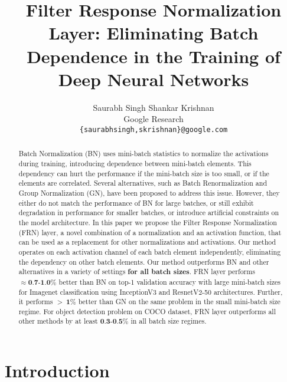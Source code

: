 \documentclass[10pt,twocolumn,letterpaper]{article}
\newcommand{\papername}{FRN}
\begin{document}
\title{Filter Response Normalization Layer: Eliminating Batch Dependence in the Training of Deep Neural Networks}

\author{Saurabh Singh \qquad Shankar Krishnan\\
Google Research\\
{\tt\small \{saurabhsingh,skrishnan\}@google.com}
}

\maketitle

\begin{abstract}
Batch Normalization (BN) uses mini-batch statistics to normalize the activations during training, introducing dependence between mini-batch elements. This dependency can hurt the performance if the mini-batch size is too small, or if the elements are correlated. Several alternatives, such as Batch Renormalization and Group Normalization (GN), have been proposed to address this issue. However, they either do not match the performance of BN for large batches, or still exhibit degradation in performance for smaller batches, or introduce artificial constraints on the model architecture.
In this paper we propose the Filter Response Normalization (\papername{}) layer, a novel combination of a normalization and an activation function, that can be used as a replacement for other normalizations and activations. Our method operates on each activation channel of each batch element independently, eliminating the dependency on other batch elements. Our method outperforms BN and other alternatives in a variety of settings \textbf{for all batch sizes}. \papername{} layer performs $\approx \textbf{0.7-1.0}\%$ better than BN on top-1 validation accuracy with large mini-batch sizes for Imagenet classification using InceptionV3 and ResnetV2-50 architectures. Further, it performs $>~\textbf{1}\%$ better than GN on the same problem in the small mini-batch size regime. For object detection problem on COCO dataset, \papername{} layer outperforms all other methods by at least $\textbf{0.3-0.5}\%$ in all batch size regimes.

\end{abstract}



\vspace*{-0.1in}
\section{Introduction}
\label{sec:intro}
\end{document}
